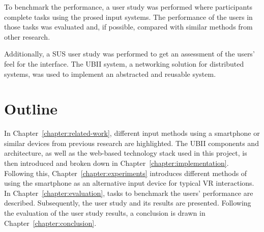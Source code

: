 To benchmark the performance, a user study was performed where participants complete tasks using the prosed input systems.
The performance of the users in those tasks was evaluated and, if possible, compared with similar methods from other research.

Additionally, a \gls{SUS} user study was performed to get an assessment of the users' feel for the interface.
The \gls{UBII} system, a networking solution for distributed systems, was used to implement an abstracted and reusable system.


\section{Outline}\label{section:outline}
In Chapter~\ref{chapter:related-work}, different input methods using a smartphone or similar devices from previous research are highlighted. The \gls{UBII} components and architecture, as well as the web-based technology stack used in this project, is then introduced and broken down in Chapter~\ref{chapter:implementation}. Following this, Chapter~\ref{chapter:experiments} introduces different methods of using the smartphone as an alternative input device for typical \gls{VR} interactions. In Chapter~\ref{chapter:evaluation}, tasks to benchmark the users' performance are described. Subsequently, the user study and its results are presented. Following the evaluation of the user study results, a conclusion is drawn in Chapter~\ref{chapter:conclusion}.